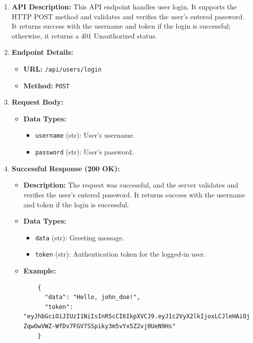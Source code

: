 \documentclass[a4 paper, 12pt]{article}
\begin{document}
\begin{enumerate}
  \item \textbf{API Description:} This API endpoint handles user login. It supports the HTTP POST method and validates and verifies the user's entered password. It returns success with the username and token if the login is successful; otherwise, it returns a 401 Unauthorized status.

  \item \textbf{Endpoint Details:}
  \begin{itemize}
    \item \textbf{URL:} \texttt{/api/users/login}
    \item \textbf{Method:} \texttt{POST}
  \end{itemize}

  \item \textbf{Request Body:}
  \begin{itemize}
    \item \textbf{Data Types:}
    \begin{itemize}
      \item \texttt{username} (str): User's username.
      \item \texttt{password} (str): User's password.
    \end{itemize}
  \end{itemize}

  \item \textbf{Successful Response (200 OK):}
  \begin{itemize}
    \item \textbf{Description:} The request was successful, and the server validates and verifies the user's entered password. It returns success with the username and token if the login is successful.
    \item \textbf{Data Types:}
    \begin{itemize}
      \item \texttt{data} (str): Greeting message.
      \item \texttt{token} (str): Authentication token for the logged-in user.
    \end{itemize}
    \item \textbf{Example:}
    \begin{verbatim}
    {
      "data": "Hello, john_doe!",
      "token": "eyJhbGciOiJIUzI1NiIsInR5cCI6IkpXVCJ9.eyJ1c2VyX2lkIjoxLCJleHAiOjE2Mzg5NTM5MDAsImlhdCI6MTYzODk1MzIwMH0.-ZqwOwVWZ-WfDv7FGV7SSpiky3m5vYx5Z2vj0UeN9Hs"
    }
    \end{verbatim}
  \end{itemize}


\end{enumerate}
\end{document}
